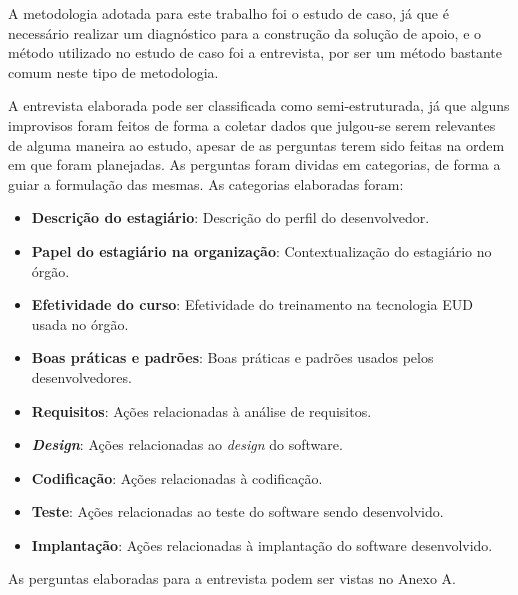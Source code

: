 A metodologia adotada para este trabalho foi o estudo de caso, já que é necessário realizar um diagnóstico para a construção da solução de apoio, e o método utilizado no estudo de caso foi a entrevista, por ser um método bastante comum neste tipo de metodologia. 

A entrevista elaborada pode ser classificada como semi-estruturada, já que alguns improvisos foram feitos de forma a coletar dados que julgou-se serem relevantes de alguma maneira ao estudo, apesar de as perguntas terem sido feitas na ordem em que foram planejadas. As perguntas foram dividas em categorias, de forma a guiar a formulação das mesmas. As categorias elaboradas foram:

\begin{itemize}
\item \textbf{Descrição do estagiário}: Descrição do perfil do desenvolvedor.
\item \textbf{Papel do estagiário na organização}: Contextualização do estagiário no órgão.
\item \textbf{Efetividade do curso}: Efetividade do treinamento na tecnologia EUD usada no órgão.
\item \textbf{Boas práticas e padrões}: Boas práticas e padrões usados pelos desenvolvedores.
\item \textbf{Requisitos}: Ações relacionadas à análise de requisitos.
\item \textbf{\textit{Design}}: Ações relacionadas ao \textit{design} do software.
\item \textbf{Codificação}: Ações relacionadas à codificação.
\item \textbf{Teste}: Ações relacionadas ao teste do software sendo desenvolvido.
\item \textbf{Implantação}: Ações relacionadas à implantação do software desenvolvido.
\end{itemize}

As perguntas elaboradas para a entrevista podem ser vistas no Anexo A.

